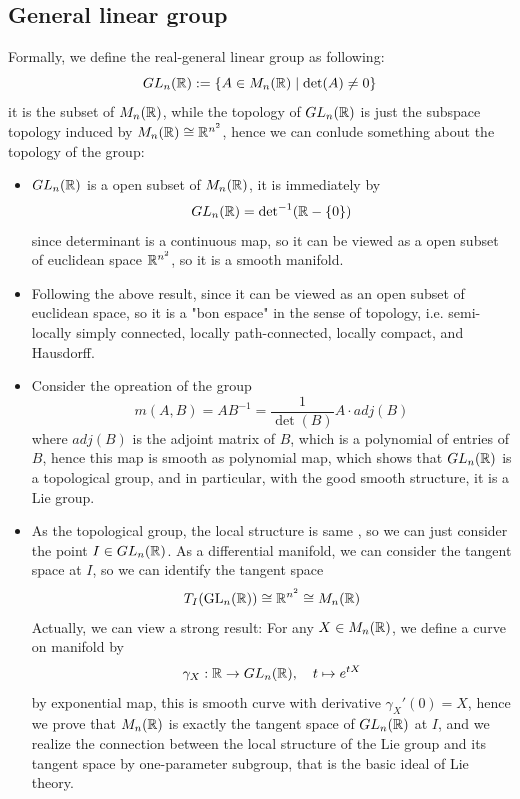 \subsection{General linear group}
Formally, we define the real-general linear group as following:
\[GL_n(\mathbb{R}) : = \{A \in M_n(\mathbb{R}) \mid \det(A) \neq 0\}\]
it is the subset of \(M_n(\mathbb{R})\), while the topology of \(GL_n(\mathbb{R})\) is just the subspace topology induced by \(M_n(\mathbb{R}) \cong \mathbb{R}^{n^2}\), hence we can conlude something about the topology of the group:

\begin{itemize}
    \item \(GL_n(\mathbb{R})\) is a open subset of \(M_n(\mathbb{R})\), it is immediately by
    \[GL_n(\mathbb{R}) = \mathrm{det}^{-1}(\mathbb{R}-\{0\})\]
    since determinant is a continuous map, so it can be viewed as a open subset of euclidean space \(\mathbb{R}^{n^2}\), so it is a smooth manifold.
    \item Following the above result, since it can be viewed as an open subset of euclidean space, so it is a "bon espace" in the sense of topology, i.e. semi-locally simply connected, locally path-connected, locally compact, and Hausdorff.
    \item Consider the opreation of the group
    \[m(A,B) = AB^{-1} = \frac{1}{\det(B)}A\cdot adj(B)\]
    where \(adj(B)\) is the adjoint matrix of \(B\), which is a polynomial of entries of \(B\), hence this map is smooth as polynomial map, which shows that \(GL_n(\mathbb{R})\) is a topological group, and in particular, with the good smooth structure, it is a Lie group.
    \item As the topological group, the local structure is same , so we can just consider the point \(I \in GL_n(\mathbb{R})\). As a differential manifold, we can consider the tangent space at \(I\), so we can identify the tangent space
    \[T_I(\mathrm{GL}_n(\mathbb{R})) \cong \mathbb{R}^{n^2} \cong M_n(\mathbb{R})\]
    Actually, we can view a strong result: For any \(X \in M_n(\mathbb{R})\), we define a curve on manifold by \[\gamma_X: \mathbb{R} \to GL_n(\mathbb{R}), \quad t \mapsto e^{tX}\]
    by exponential map, this is smooth curve with derivative \(\gamma_X'(0) = X\), hence we prove that \(M_n(\mathbb{R})\) is exactly the tangent space of \(GL_n(\mathbb{R})\) at \(I\), and we realize the connection between the local structure of the Lie group and its tangent space by one-parameter subgroup, that is the basic ideal of Lie theory.
\end{itemize}

